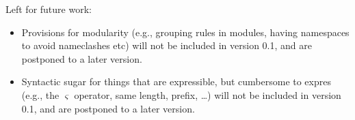 \documentclass[a4paper,11pt,pdftex]{article}
\begin{document}
\smallskip


Left for future work:
\begin{itemize}
\item Provisions for modularity (e.g., grouping rules in modules, having namespaces to avoid nameclashes etc) will not be included in version 0.1, and are postponed to a later version.
\item Syntactic sugar for things that are expressible, but cumbersome to expres (e.g., the $\varsigma$ operator, same length, prefix, \dots)  will not be included in version 0.1, and are postponed to a later version.
\end{itemize}

 




\end{document}
